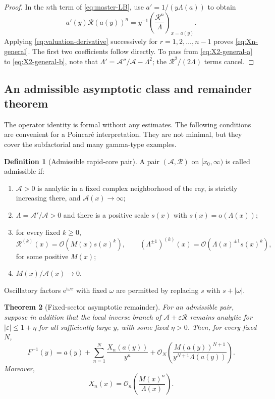 \documentclass[11pt,a4paper]{article}
\numberwithin{equation}{section}
\newtheorem{theorem}{Theorem}[section]
\theoremstyle{definition}
\newtheorem{definition}[theorem]{Definition}
\theoremstyle{remark}
\newcommand{\e}{\mathrm e}
\newcommand{\ii}{\mathrm i}
\newcommand{\Ord}{\mathcal O}
\newcommand{\littleo}{\mathrm o}
\newcommand{\Core}{\mathcal A}
\newcommand{\Lam}{\Lambda}
\newcommand{\Res}{\mathcal R}
\begin{document}
\begin{proof}
In the $n$th term of \eqref{eq:master-LB}, use
$a'=1/(y\Lam(a))$ to obtain
\[
 a'(y)\Res(a(y))^n
 =y^{-1}\left(\frac{\Res^n}{\Lam}\right)_{x=a(y)}.
\]
Applying \eqref{eq:valuation-derivative} successively for
$r=1,2,\ldots,n-1$ proves \eqref{eq:Xn-general}.  The first two
coefficients follow directly.  To pass from \eqref{eq:X2-general-a} to
\eqref{eq:X2-general-b}, note that
$\Lam'=\Core''/\Core-\Lam^2$; the $\Res^2/(2\Lam)$ terms cancel.
\end{proof}

\subsection{An admissible asymptotic class and remainder theorem}

The operator identity is formal without any estimates.  The following
conditions are convenient for a Poincar\'e interpretation.  They are not
minimal, but they cover the subfactorial and many gamma-type examples.

\begin{definition}[Admissible rapid-core pair]\label{def:admissible-pair}
A pair $(\Core,\Res)$ on $[x_0,\infty)$ is called admissible if:
\begin{enumerate}
\item $\Core>0$ is analytic in a fixed complex neighborhood of the ray,
      is strictly increasing there, and $\Core(x)\to\infty$;
\item $\Lam=\Core'/\Core>0$ and there is a positive scale $s(x)$ with
      $s(x)=\littleo(\Lam(x))$;
\item for every fixed $k\ge0$,
\[
 \Res^{(k)}(x)=\Ord(M(x)s(x)^k),
 \qquad
 (\Lam^{\pm1})^{(k)}(x)
 =\Ord(\Lam(x)^{\pm1}s(x)^k),
\]
for some positive $M(x)$;
\item $M(x)/\Core(x)\to0$.
\end{enumerate}
Oscillatory factors $\e^{\ii\omega x}$ with fixed $\omega$ are permitted by
replacing $s$ with $s+|\omega|$.
\end{definition}

\begin{theorem}[Fixed-sector asymptotic remainder]
\label{thm:general-remainder}
For an admissible pair, suppose in addition that the local inverse branch of
$\Core+\varepsilon\Res$ remains analytic for $|\varepsilon|\le1+\eta$ for
all sufficiently large $y$, with some fixed $\eta>0$.  Then, for every fixed
$N$,
\begin{equation}\label{eq:general-remainder}
 F^{-1}(y)=a(y)+\sum_{n=1}^{N}\frac{X_n(a(y))}{y^n}
 +\Ord_N\!\left(
 \frac{M(a(y))^{N+1}}{y^{N+1}\Lam(a(y))}
 \right).
\end{equation}
Moreover,
\begin{equation}\label{eq:Xn-size}
 X_n(x)=\Ord_n\!\left(\frac{M(x)^n}{\Lam(x)}\right).
\end{equation}
\end{theorem}
\end{document}
